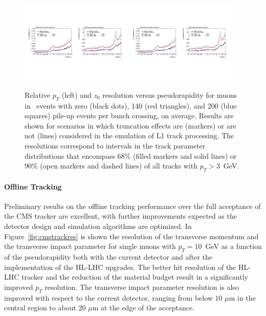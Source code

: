 \begin{figure}[h!tbp]
\begin{center}
  \includegraphics[width=0.47\textwidth]{figures/cmsupgrade/TDR-17-001_fig6_8_a.pdf} \hfill
  \includegraphics[width=0.47\textwidth]{figures/cmsupgrade/TDR-17-001_fig6_8_b.pdf}
  \caption{ Relative $p_T$ (left) and $z_0$ resolution versus pseudorapidity for muons in \ttbar~events with zero (black dots), 140 (red triangles), and 200 (blue squares) pile-up events per bunch crossing, on average. Results are shown for scenarios in which truncation effects are (markers) or are not (lines) considered in the emulation of L1 track processing. The resolutions correspond to intervals in the track parameter distributions that encompass $68\%$ (filled markers and solid lines) or $90\%$ (open markers and dashed lines) of all tracks with $p_T > 3$~GeV.}
  \label{fig:cmsL1tracks}
\end{center}
\end{figure}

\paragraph{Offline Tracking}

Preliminary results on the offline tracking performance over the full acceptance of the CMS tracker are excellent, with further improvements expected as the detector design and simulation algorithms are optimized. In Figure~\ref{fig:cmstrackres} is shown the resolution of the transverse momentum and the transverse impact parameter for single muons with $p_T = 10$~GeV as a function of the pseudorapidity both with the current detector and after the implementation of the HL-LHC upgrades. The better hit resolution of the HL-LHC tracker and the reduction of the material budget result in a significantly improved $p_T$ resolution. The transverse impact parameter resolution is also improved with respect to the current detector, ranging from below $10\,\,\mu\mathrm{m}$ in the central region to about $20\,\,\mu\mathrm{m}$ at the edge of the acceptance.

